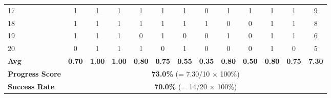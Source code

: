 \documentclass[onecolumn]{robbyant}           %
\begin{document}
\begin{table}[t]
{\begin{tabular}{l|c|cccccccccc|c}
17 & 1 & 1 & 1 & 1 & 1 & 1 & 0 & 1 & 1 & 1 & 1 & 9 \\
18 & 1 & 1 & 1 & 1 & 1 & 1 & 1 & 0 & 0 & 1 & 1 & 8 \\
19 & 1 & 1 & 1 & 0 & 1 & 0 & 0 & 1 & 0 & 1 & 1 & 6 \\
20 & 0 & 1 & 1 & 1 & 0 & 1 & 0 & 0 & 0 & 1 & 0 & 5 \\
\midrule
\textbf{Avg} & \textbf{0.70} & \textbf{1.00} & \textbf{1.00} & \textbf{0.80} & \textbf{0.75} & \textbf{0.55} & \textbf{0.35} & \textbf{0.80} & \textbf{0.50} & \textbf{0.80} & \textbf{0.75} & \textbf{7.30} \\
\textbf{Progress Score} & \multicolumn{12}{c}{\textbf{73.0\%} (= 7.30/10 $\times$ 100\%)} \\
\textbf{Success Rate} & \multicolumn{12}{c}{\textbf{70.0\%} (= 14/20 $\times$ 100\%)} \\
\bottomrule
\end{tabular}
}
\end{table}
\end{document}
